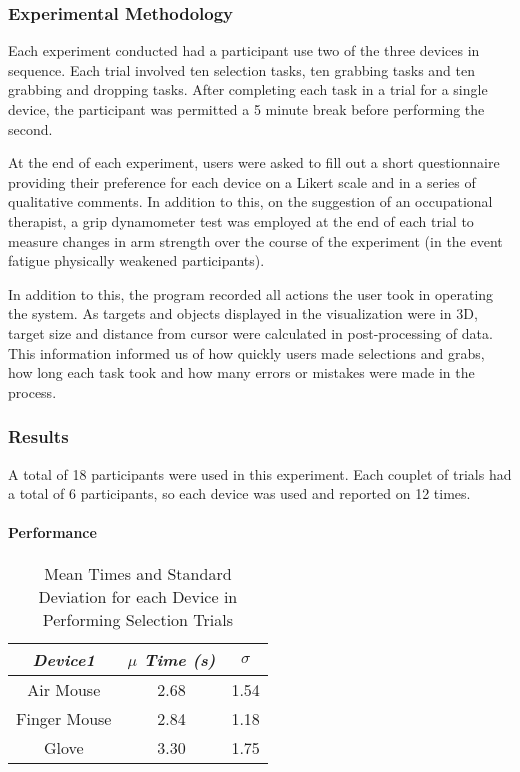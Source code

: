 \subsubsection{Experimental Methodology}

Each experiment conducted had a participant use two of the three devices in sequence. Each trial involved ten selection tasks, ten grabbing tasks and ten grabbing and dropping tasks. After completing each task in a trial for a single device, the participant was permitted a 5 minute break before performing the second.

At the end of each experiment, users were asked to fill out a short questionnaire providing their preference for each device on a Likert scale and in a series of qualitative comments. In addition to this, on the suggestion of an occupational therapist, a grip dynamometer test was employed at the end of each trial to measure changes in arm strength over the course of the experiment (in the event fatigue physically weakened participants).

In addition to this, the program recorded all actions the user took in operating the system. As targets and objects displayed in the visualization were in 3D, target size and distance from cursor were calculated in post-processing of data. This information informed us of how quickly users made selections and grabs, how long each task took and how many errors or mistakes were made in the process.

\subsubsection{Results}

A total of 18 participants were used in this experiment. Each couplet of trials had a total of 6 participants, so each device was used and reported on 12 times.

\paragraph{Performance}

\begin{table}
\centering
\begin{tabular}{c | c | c}
\emph{Device1} & \emph{$\mu$ Time (s)} & \emph{$\sigma$} \\
\hline
Air Mouse & 2.68 & 1.54  \\
Finger Mouse & 2.84 &  1.18 \\
Glove & 3.30 & 1.75 \\
\end{tabular}
\caption{Mean Times and Standard Deviation for each Device in Performing Selection Trials}
\end{table}

